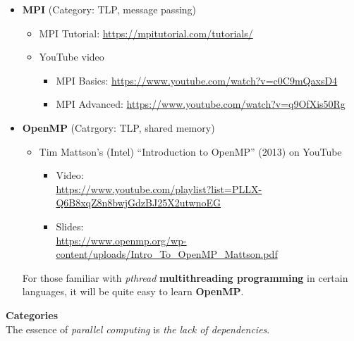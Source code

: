 \documentclass{article}
\begin{document}
\begin{itemize}
\begin{itemize}
    \end{itemize}
    \item \textbf{MPI} (Category: TLP, message passing)
    \begin{itemize}
        \item MPI Tutorial:
        \href{https://mpitutorial.com/tutorials/}{https://mpitutorial.com/tutorials/}
        \item YouTube video
        \begin{itemize}
            \item MPI Basics:
            \href{https://www.youtube.com/watch?v=c0C9mQaxsD4}{https://www.youtube.com/watch?v=c0C9mQaxsD4}
            \item MPI Advanced:
            \href{https://www.youtube.com/watch?v=q9OfXis50Rg}{https://www.youtube.com/watch?v=q9OfXis50Rg}
        \end{itemize}
    \end{itemize}
    \item \textbf{OpenMP} (Catrgory: TLP, shared memory)
    \begin{itemize}
        \item Tim Mattson’s (Intel) “Introduction to OpenMP” (2013) on YouTube
        \begin{itemize}
            \item Video:\\
            \href{https://www.youtube.com/playlist?list=PLLX-Q6B8xqZ8n8bwjGdzBJ25X2utwnoEG}{https://www.youtube.com/playlist?list=PLLX-Q6B8xqZ8n8bwjGdzBJ25X2utwnoEG}
            \item Slides:\\
            \href{https://www.openmp.org/wp-content/uploads/Intro\_To\_OpenMP\_Mattson.pdf}{https://www.openmp.org/wp-content/uploads/Intro\_To\_OpenMP\_Mattson.pdf}
        \end{itemize}
    \end{itemize}
    For those familiar with \emph{pthread} \textbf{multithreading programming} in certain languages, it will be quite easy to learn \textbf{OpenMP}.
\end{itemize}
\textbf{Categories}\\
The essence of \emph{parallel computing} is \emph{the lack of dependencies}.
\end{document}
